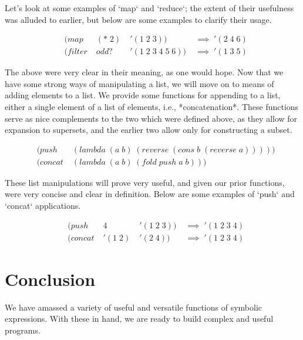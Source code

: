 Let's look at some examples of `map` and `reduce`; the extent of their usefulness 
was alluded to earlier, but below are some examples to clarify their usage.

\begin{align*}
& (map \; &(* \; 2) \; &'(1 \; 2 \; 3)) \; &\implies \; '(2 \; 4 \; 6)
\\& (filter \; &odd? \; &'(1 \; 2 \; 3 \; 4 \; 5 \; 6)) \; &\implies \; '(1 \; 3 \; 5)
\end{align*}

The above were very clear in their meaning, as one would hope. Now that we have 
some strong ways of manipulating a list, we will move on to means of adding 
elements to a list. We provide some functions for appending to a list, either a 
single element of a list of elements, i.e., *concatenation*. These functions serve 
as nice complements to the two which were defined above, as they allow for 
expansion to supersets, and the earlier two allow only for constructing a subset.

\begin{align*}
& (push \; &(lambda \; (a \; b) \; (reverse \; (cons \; b \; (reverse \; a)))))
\\& (concat \; &(lambda \; (a \; b) \; (fold \; push \; a \; b)))
\end{align*}

These list manipulations will prove very useful, and given our prior functions, 
were very concise and clear in definition. Below are some examples of `push` and 
`concat` applications.

\begin{align*}
& (push \; &4 \; &'(1 \; 2 \; 3)) \; &\implies \; '(1 \; 2 \; 3 \; 4)
\\& (concat \; &'(1 \; 2) \; &'(2 \; 4)) \; &\implies \; '(1 \; 2 \; 3 \; 4)
\end{align*}

\section{Conclusion}
We have amassed a variety of useful and versatile functions of symbolic 
expressions. With these in hand, we are ready to build complex and useful 
programs.
